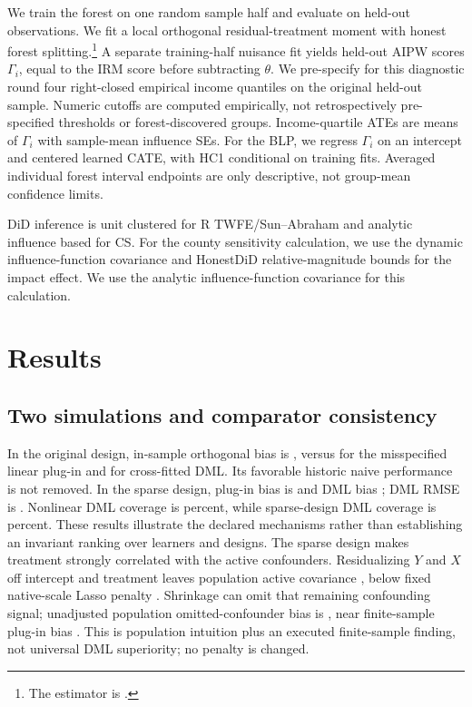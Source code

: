 We train the forest on one random sample half and evaluate on \HoldoutN{} held-out observations. We fit a local orthogonal residual-treatment moment with honest forest splitting.\footnote{The estimator is .} A separate training-half nuisance fit yields held-out AIPW scores $\Gamma_i$, equal to the IRM score before subtracting $\theta$. We pre-specify for this diagnostic round four right-closed empirical income quantiles on the original held-out sample. Numeric cutoffs are computed empirically, not retrospectively pre-specified thresholds or forest-discovered groups. Income-quartile ATEs are means of $\Gamma_i$ with sample-mean influence SEs. For the BLP, we regress $\Gamma_i$ on an intercept and centered learned CATE, with HC1 conditional on training fits. Averaged individual forest interval endpoints are only descriptive, not group-mean confidence limits.

DiD inference is unit clustered for R TWFE/Sun--Abraham and analytic influence based for CS. For the county sensitivity calculation, we use the dynamic influence-function covariance and HonestDiD relative-magnitude bounds for the impact effect. We use the analytic influence-function covariance for this calculation.
\section{Results}
\subsection{Two simulations and comparator consistency}

In the original design, in-sample orthogonal bias is \OriginalNaiveBias{}, versus \OriginalPluginBias{} for the misspecified linear plug-in and \OriginalDMLBias{} for cross-fitted DML. Its favorable historic naive performance is not removed. In the sparse design, plug-in bias is \SparsePluginBias{} and DML bias \SparseDMLBias{}; DML RMSE is \SparseDMLRMSE{}. Nonlinear DML coverage is \OriginalDMLCoverage{} percent, while sparse-design DML coverage is \SparseDMLCoverage{} percent. These results illustrate the declared mechanisms rather than establishing an invariant ranking over learners and designs.
The sparse design makes treatment strongly correlated with the active confounders. Residualizing $Y$ and $X$ off intercept and treatment leaves population active covariance \ProjectedCovariance{}, below fixed native-scale Lasso penalty \MechanismPenalty{}. Shrinkage can omit that remaining confounding signal; unadjusted population omitted-confounder bias is \PopulationBias{}, near finite-sample plug-in bias \SparsePluginBias{}. This is population intuition plus an executed finite-sample finding, not universal DML superiority; no penalty is changed.
